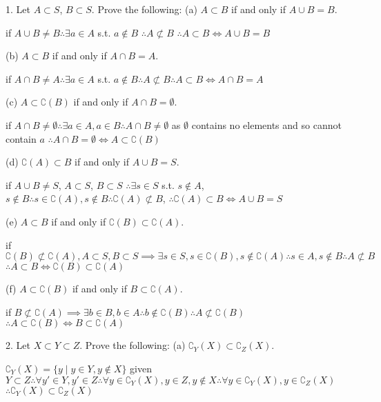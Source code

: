 1. Let $A \subset S$, $B \subset S$. Prove the following:
(a) $A \subset B$ if and only if $A \cup B = B$.

if $A \cup B \not = B \therefore \exists a \in A$ s.t.  $a \not \in B$ $\therefore A \not \subset B$ $\therefore A\subset B \iff A \cup B = B$

(b) $A \subset B$ if and only if $A \cap B = A$.

if $A \cap B \not = A \therefore \exists a \in A$ s.t. $a \not \in B \therefore A \not\subset B \therefore A \subset B\iff A \cap B = A$

(c) $A \subset \complement(B)$ if and only if $A \cap B = \emptyset$.

    if $A \cap B \not = \emptyset \therefore \exists a \in A , a \in B \therefore A \cap B  \not =\emptyset$ as $\emptyset$ contains no elements and so cannot contain $a$ $\therefore A \cap B = \emptyset \iff A\subset \complement(B)$

(d) $\complement(A) \subset B$ if and only if $A \cup B = S$.

if $A \cup B \not = S$, $A \subset S$, $B \subset S$ $ \therefore \exists s \in S$ s.t. $s \not \in A$, $s \not \in B \therefore s \in \complement(A), s \not \in B \therefore \complement(A) \not \subset B$, $\therefore \complement(A) \subset B \iff A \cup B = S$

(e) $A \subset B$ if and only if $\complement(B) \subset \complement(A)$.

if  $\complement(B) \not \subset \complement(A), A \subset S, B\subset S \implies \exists s \in S, s\in \complement(B), s \not \in \complement(A) \therefore s\in A, s\not \in B \therefore A \not \subset B$
$\therefore A \subset B \iff \complement(B) \subset \complement(A)$

(f) $A \subset \complement(B)$ if and only if $B \subset \complement(A)$.

if $B \not \subset \complement(A) \implies \exists b \in B, b \in A \therefore b \not \in \complement(B) \therefore A \not \subset \complement(B)$
$\therefore A \subset \complement(B) \iff B \subset \complement(A)$

2. Let $X \subset Y \subset Z$. Prove the following:
(a) $\complement_{Y}(X) \subset \complement_{Z}(X)$.


$\complement_{Y}(X)= \{y \mid y \in Y, y \not \in X\}$ given $Y \subset Z \therefore \forall y' \in Y, y' \in Z \therefore \forall y \in \complement_{Y}(X), y \in Z, y \not \in  X \therefore \forall y \in \complement_{Y}(X), y \in \complement_{Z}(X)$
$\therefore \complement_{Y}(X) \subset \complement_{Z}(X)$

